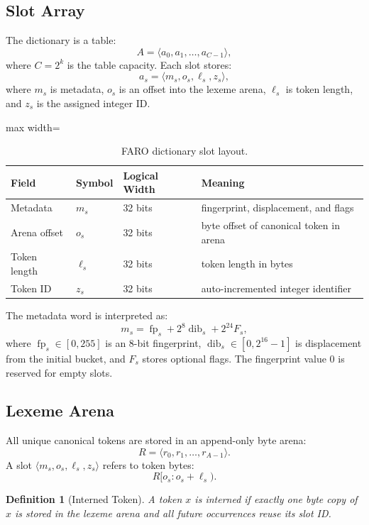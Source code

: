 \documentclass[11pt,a4paper]{article}
\newtheorem{definition}{Definition}
\newcommand{\FP}{\operatorname{fp}}
\newcommand{\DIB}{\operatorname{dib}}
\begin{document}
\subsection{Slot Array}

The dictionary is a table:
\[
A=\langle a_0,a_1,\dots,a_{C-1}\rangle,
\]
where \(C=2^k\) is the table capacity. Each slot stores:
\[
a_s = \langle m_s,o_s,\ell_s,z_s\rangle,
\]
where \(m_s\) is metadata, \(o_s\) is an offset into the lexeme arena, \(\ell_s\) is token length, and \(z_s\) is the assigned integer ID.

\begin{table}[H]
\centering
\caption{FARO dictionary slot layout.}
\label{tab:slot-layout}
\small
\begin{adjustbox}{max width=\textwidth}
\begin{tabular}{llll}
\toprule
Field & Symbol & Logical Width & Meaning \\
\midrule
Metadata & \(m_s\) & 32 bits & fingerprint, displacement, and flags \\
Arena offset & \(o_s\) & 32 bits & byte offset of canonical token in arena \\
Token length & \(\ell_s\) & 32 bits & token length in bytes \\
Token ID & \(z_s\) & 32 bits & auto-incremented integer identifier \\
\bottomrule
\end{tabular}
\end{adjustbox}
\end{table}

The metadata word is interpreted as:
\[
m_s = \FP_s + 2^8\DIB_s + 2^{24}F_s,
\]
where \(\FP_s\in[0,255]\) is an 8-bit fingerprint, \(\DIB_s\in[0,2^{16}-1]\) is displacement from the initial bucket, and \(F_s\) stores optional flags. The fingerprint value \(0\) is reserved for empty slots.

\subsection{Lexeme Arena}

All unique canonical tokens are stored in an append-only byte arena:
\[
R = \langle r_0,r_1,\dots,r_{A-1}\rangle.
\]
A slot \(\langle m_s,o_s,\ell_s,z_s\rangle\) refers to token bytes:
\[
R[o_s:o_s+\ell_s).
\]

\begin{definition}[Interned Token]
A token \(x\) is interned if exactly one byte copy of \(x\) is stored in the lexeme arena and all future occurrences reuse its slot ID.
\end{definition}
\end{document}

